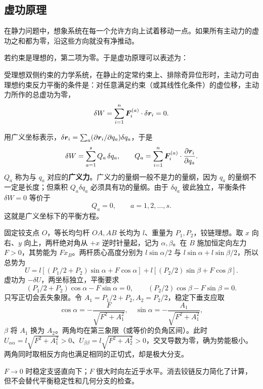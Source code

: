 \subsection{虚功原理}

在静力问题中，想象系统在每一个允许方向上试着移动一点。如果所有主动力的虚功之和都为零，沿这些方向就没有净推动。

若约束是理想的，第二项为零。于是虚功原理可以表述为：

\begin{keybox}
受理想双侧约束的力学系统，在静止的定常约束上、排除奇异位形时，主动力可由理想约束反力平衡的条件是：对任意满足约束（或其线性化条件）的虚位移，主动力所作的总虚功为零，
\begin{equation}
\delta W=\sum_{i=1}^{n}\boldsymbol{F}_i^{(a)}\cdot\delta\boldsymbol{r}_i=0.
\label{eq:virtual-work}
\end{equation}
\end{keybox}

用广义坐标表示，$\delta\boldsymbol{r}_i=\sum_a(\partial\boldsymbol{r}_i/\partial q_a)\delta q_a$，于是
\begin{equation}
\delta W=\sum_{a=1}^{s}Q_a\,\delta q_a,
\qquad
Q_a=\sum_{i=1}^{n}\boldsymbol{F}_i^{(a)}\cdot\frac{\partial \boldsymbol{r}_i}{\partial q_a}.
\label{eq:generalized-force}
\end{equation}
$Q_a$ 称为与 $q_a$ 对应的\textbf{广义力}。广义力的量纲一般不是力的量纲，因为 $q_a$ 的量纲不一定是长度；但乘积 $Q_a\delta q_a$ 必须具有功的量纲。由于 $\delta q_a$ 彼此独立，平衡条件 $\delta W=0$ 等价于
\begin{equation}
Q_a=0,\qquad a=1,2,\dots,s.
\label{eq:equilibrium-generalized}
\end{equation}
这就是广义坐标下的平衡方程。

\begin{example}
固定铰支点 $O$，等长均匀杆 $OA,AB$ 长均为 $l$、重量为 $P_1,P_2$，铰链理想。取 $x$ 向右、$y$ 向上，两杆绝对角从 $+x$ 逆时针量起，记为 $\alpha,\beta$。在 $B$ 施加恒定向左力 $F>0$，其势能为 $Fx_B$。两杆质心高度分别为 $l\sin\alpha/2$ 与 $l\sin\alpha+l\sin\beta/2$，所以总势为
\[
U=l[(P_1/2+P_2)\sin\alpha+F\cos\alpha]
+l[(P_2/2)\sin\beta+F\cos\beta].
\]
虚功为 $-\delta U$，两坐标独立，平衡要求
\[
(P_1/2+P_2)\cos\alpha-F\sin\alpha=0,
\qquad(P_2/2)\cos\beta-F\sin\beta=0.
\]
只写正切会丢失象限。令 $A_1=P_1/2+P_2,A_2=P_2/2$，稳定下垂支应取
\[
\cos\alpha=-\frac{F}{\sqrt{F^2+A_1^2}},\quad
\sin\alpha=-\frac{A_1}{\sqrt{F^2+A_1^2}},
\]
$\beta$ 将 $A_1$ 换为 $A_2$。两角均在第三象限（或等价的负角区间）。此时 $U_{\alpha\alpha}=l\sqrt{F^2+A_1^2}>0$、$U_{\beta\beta}=l\sqrt{F^2+A_2^2}>0$，交叉导数为零，确为势能极小。两角同时取相反方向也满足相同的正切式，却是极大分支。

$F\to0$ 时稳定支竖直向下；$F$ 很大时向左近乎水平。消去铰链反力简化了计算，但不会替代平衡稳定性和几何分支的检查。
\end{example}

